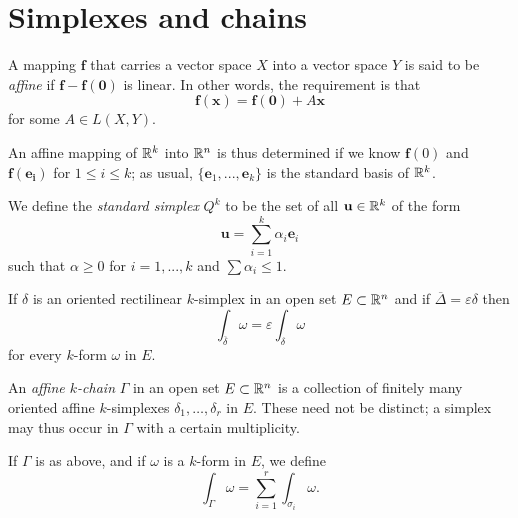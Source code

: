 
\section{Simplexes and chains}

\begin{mydef}
    A mapping $\mathbf{f}$ that carries a vector space $X$ into a
    vector space $Y$ is said to be \emph{affine} if $\mathbf{f - f(0)}$ is linear. 
    In other words, the requirement is that
    \begin{equation}
        \label{eq:10.73}
        \mathbf{f(x)} = 
        \mathbf{f(0)} + A \mathbf{x}
    \end{equation}
    for some $A \in L(X, Y)$.

    An affine mapping of ${\protect\mathbb R}^k$ into ${\protect\mathbb R}^n$ is thus determined if we know $\mathbf{f}(0)$ and $\mathbf{f(e_i)}$ for $1 \leq i \leq k$; 
    as usual, $\{\mathbf{e}_1, ... , \mathbf{e}_k\}$ is the standard basis of ${\protect\mathbb R}^k$.
    
    We define the \emph{standard simplex} $Q^k$ to be the set of all $\mathbf{u} \in {\protect\mathbb R}^k$ of the form
    \begin{equation}
        \label{eq;10.74}
        \mathbf{u} = \sum_{i=1}^{k} \alpha_i \mathbf{e}_i
    \end{equation}
    such that $\alpha \geq 0$ for $i = 1, ... , k$ and $\sum \alpha_i \leq 1$.
\end{mydef}

\begin{thm}
    \label{thm:10.27}
    If $\delta$ is an oriented rectilinear $k$-simplex in an open set $E \subset {\protect\mathbb R}^n$ 
    and if $\overline{\Delta} = \varepsilon \delta$ then
    \begin{equation}
        \label{eq:10.81}
        \int_{\overline{\delta}} \omega = 
        \varepsilon \int_{\delta} \omega 
    \end{equation}
    for every $k$-form $\omega$ in $E$.
\end{thm}


\begin{mydef}
    An \emph{affine $k$-chain} $\Gamma$ in an open set $E \subset {\protect\mathbb R}^n$ is a collection of finitely many oriented affine $k$-simplexes $\delta_1, \dots, \delta_r$ in $E$. 
    These need not be distinct; 
    a simplex may thus occur in $\Gamma$ with a certain multiplicity.

    If $\Gamma$ is as above, and if $\omega$ is a $k$-form in $E$,
    we define 
    \begin{equation}
        \label{eq:10.82}
        \int_{\Gamma} \omega =
        \sum_{i=1}^{r} \int_{\sigma_i} \omega .
    \end{equation}
\end{mydef}

